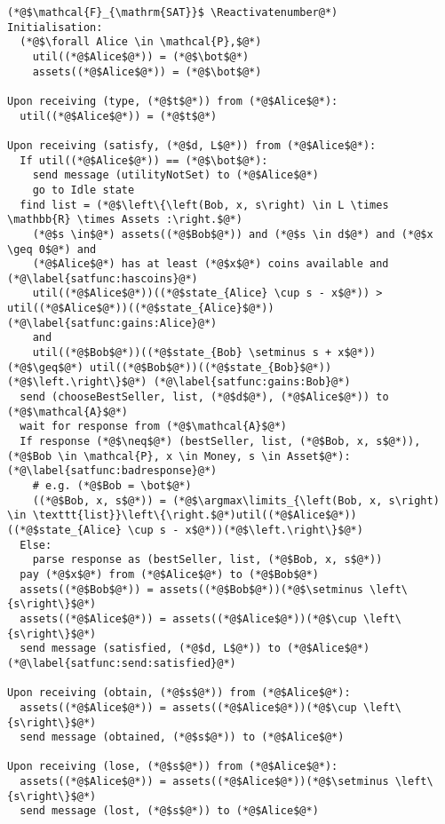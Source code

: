 \Suppressnumber
\begin{lstlisting}[label=satfunc, style=numbers]
(*@$\mathcal{F}_{\mathrm{SAT}}$ \Reactivatenumber@*)
Initialisation:
  (*@$\forall Alice \in \mathcal{P},$@*)
    util((*@$Alice$@*)) = (*@$\bot$@*)
    assets((*@$Alice$@*)) = (*@$\bot$@*)

Upon receiving (type, (*@$t$@*)) from (*@$Alice$@*):
  util((*@$Alice$@*)) = (*@$t$@*)

Upon receiving (satisfy, (*@$d, L$@*)) from (*@$Alice$@*):
  If util((*@$Alice$@*)) == (*@$\bot$@*):
    send message (utilityNotSet) to (*@$Alice$@*)
    go to Idle state
  find list = (*@$\left\{\left(Bob, x, s\right) \in L \times \mathbb{R} \times Assets :\right.$@*)
    (*@$s \in$@*) assets((*@$Bob$@*)) and (*@$s \in d$@*) and (*@$x \geq 0$@*) and
    (*@$Alice$@*) has at least (*@$x$@*) coins available and (*@\label{satfunc:hascoins}@*)
    util((*@$Alice$@*))((*@$state_{Alice} \cup s - x$@*)) > util((*@$Alice$@*))((*@$state_{Alice}$@*)) (*@\label{satfunc:gains:Alice}@*)
    and
    util((*@$Bob$@*))((*@$state_{Bob} \setminus s + x$@*)) (*@$\geq$@*) util((*@$Bob$@*))((*@$state_{Bob}$@*))(*@$\left.\right\}$@*) (*@\label{satfunc:gains:Bob}@*)
  send (chooseBestSeller, list, (*@$d$@*), (*@$Alice$@*)) to (*@$\mathcal{A}$@*)
  wait for response from (*@$\mathcal{A}$@*)
  If response (*@$\neq$@*) (bestSeller, list, (*@$Bob, x, s$@*)), (*@$Bob \in \mathcal{P}, x \in Money, s \in Asset$@*): (*@\label{satfunc:badresponse}@*)
    # e.g. (*@$Bob = \bot$@*)
    ((*@$Bob, x, s$@*)) = (*@$\argmax\limits_{\left(Bob, x, s\right) \in \texttt{list}}\left\{\right.$@*)util((*@$Alice$@*))((*@$state_{Alice} \cup s - x$@*))(*@$\left.\right\}$@*)
  Else:
    parse response as (bestSeller, list, (*@$Bob, x, s$@*))
  pay (*@$x$@*) from (*@$Alice$@*) to (*@$Bob$@*)
  assets((*@$Bob$@*)) = assets((*@$Bob$@*))(*@$\setminus \left\{s\right\}$@*)
  assets((*@$Alice$@*)) = assets((*@$Alice$@*))(*@$\cup \left\{s\right\}$@*)
  send message (satisfied, (*@$d, L$@*)) to (*@$Alice$@*) (*@\label{satfunc:send:satisfied}@*)

Upon receiving (obtain, (*@$s$@*)) from (*@$Alice$@*):
  assets((*@$Alice$@*)) = assets((*@$Alice$@*))(*@$\cup \left\{s\right\}$@*)
  send message (obtained, (*@$s$@*)) to (*@$Alice$@*)

Upon receiving (lose, (*@$s$@*)) from (*@$Alice$@*):
  assets((*@$Alice$@*)) = assets((*@$Alice$@*))(*@$\setminus \left\{s\right\}$@*)
  send message (lost, (*@$s$@*)) to (*@$Alice$@*)
\end{lstlisting}
